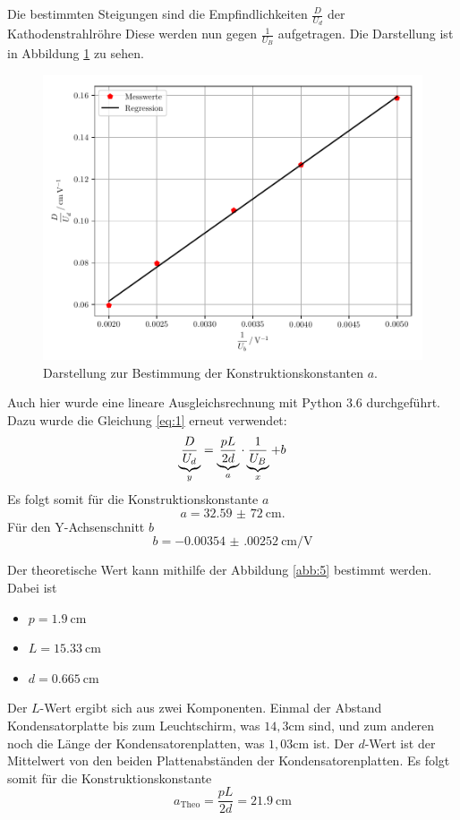 Die bestimmten Steigungen sind die Empfindlichkeiten $\frac{D}{U_d}$ der Kathodenstrahlröhre
Diese werden nun gegen $\frac{1}{U_B}$ aufgetragen.
Die Darstellung ist in Abbildung \ref{abb:11} zu sehen.
\begin{figure}[H]
  \centering
  \includegraphics[width=\textwidth]{plot6.pdf}
  \caption{Darstellung zur Bestimmung der Konstruktionskonstanten $a$.}
  \label{abb:11}
\end{figure}
Auch hier wurde eine lineare Ausgleichsrechnung mit Python 3.6 durchgeführt.
Dazu wurde die Gleichung \ref{eq:1} erneut verwendet:
\begin{equation*}
  \underbrace{\frac{D}{U_d}}_{\mathclap{y}} = \underbrace{\frac{pL}{2d}}_{\mathclap{a}} \cdot \underbrace{\frac{1}{U_B}}_{\mathclap{x}} + b
\end{equation*}
Es folgt somit für die Konstruktionskonstante $a$
\begin{equation*}
  a = \SI{32,59(72)}{\centi\meter}.
\end{equation*}
Für den Y-Achsenschnitt $b$
\begin{equation*}
  b = \SI{-0.00354(00252)}{\centi\meter\per\volt}
\end{equation*}

Der theoretische Wert kann mithilfe der Abbildung \ref{abb:5} bestimmt werden.
Dabei ist
\begin{itemize}
  \item $p = \SI{1.9}{\centi\meter}$
  \item $L = \SI{15.33}{\centi\meter}$
  \item $d = \SI{0.665}{\centi\meter}$
\end{itemize}
Der $L$-Wert ergibt sich aus zwei Komponenten. Einmal der Abstand Kondensatorplatte bis
zum Leuchtschirm, was $14,3 \si{\centi\meter}$ sind, und zum anderen noch die Länge
der Kondensatorenplatten, was $1,03 \si{\centi\meter}$ ist.
Der $d$-Wert ist der Mittelwert von den beiden Plattenabständen der Kondensatorenplatten.
Es folgt somit für die Konstruktionskonstante
\begin{equation*}
  a_{\text{Theo}} = \frac{pL}{2d} = \SI{21.9}{\centi\meter}
\end{equation*}

